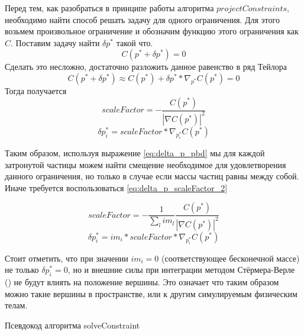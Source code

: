 	Перед тем, как разобраться в принципе работы алгоритма  $projectConstraints$, необходимо найти способ решать задачу для одного ограничения. Для этого возьмем произвольное ограничение и обозначим функцию этого ограничения как $C$. Поставим задачу найти $\delta p^*$ такой что.
	\begin{equation}
		C(p^* + \delta p^*) = 0
	\end{equation}
	Сделать это несложно, достаточно разложить данное равенство в ряд Тейлора
	\begin{equation}
		C(p^* + \delta p^*) \approx C(p^*) + \delta p^* * \nabla_{p^*} C(p^*) = 0
	\end{equation}
	Тогда получается
	\begin{equation} \label{eq:delta_p_scaleFactor}
		scaleFactor = -\frac{C(p^*)}{|\nabla C(p^*)|^2}
	\end{equation}
	\begin{equation} \label{eq:delta_p_pbd}
		\delta p^*_i = scaleFactor* \nabla_{p^*_i} C(p^*)
	\end{equation}
	
	Таким образом, используя выражение \ref{eq:delta_p_pbd} мы для каждой затронутой частицы можем найти смещение необходимое для удовлетворения данного ограничения, но только в случае если массы частиц равны между собой. Иначе требуется воспользоваться \ref{eq:delta_p_scaleFactor_2}
	
	\begin{equation} \label{eq:delta_p_scaleFactor_2}
		scaleFactor = -\frac{1}{\sum_l im_l} \frac{C(p^*)}{|\nabla C(p^*)|^2}
	\end{equation}
	\begin{equation} \label{eq:delta_p_pbd_2}
		\delta p^*_i = im_i * scaleFactor * \nabla_{p^*_i} C(p^*)
	\end{equation}

	Стоит отметить, что при значении $im_i = 0$ (соответствующее бесконечной массе) не только $\delta p^*_i = 0$, но и внешние силы при интеграции методом Стёрмера-Верле () не будут влиять на положение вершины. Это означает что таким образом можно  такие вершины в пространстве, или  к другим симулируемым физическим телам.
	
	\begin{algorithm} %
		\nonl{}
		\caption{Псевдокод алгоритма solveConstraint}\label{alg:SolveConstraint}
	\end{algorithm}
	\FloatBarrier
	
